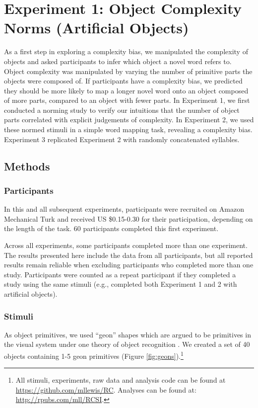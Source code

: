 \documentclass[man]{apa2}
\begin{document}
\section{Experiment 1: Object Complexity Norms (Artificial Objects)}

As a first step in exploring a complexity bias, we manipulated the complexity of objects and asked participants to infer which object a novel word refers to. Object complexity was manipulated by varying the number of primitive parts the objects were composed of. If participants have a complexity bias, we predicted they should be more likely to map a longer novel word onto an object composed of more parts, compared to an object with fewer parts. In Experiment 1, we first conducted a norming study to verify our intuitions that the number of object parts correlated with explicit judgements of complexity. In Experiment 2, we used these normed stimuli in a simple word mapping task, revealing a complexity bias. Experiment 3 replicated Experiment 2 with randomly concatenated syllables.


\subsection{Methods}

\subsubsection{Participants} In this and all subsequent experiments, participants were recruited on Amazon Mechanical Turk and received US \$0.15-0.30 for their participation, depending on the length of the task. 60 participants completed this first experiment.

Across all experiments, some participants completed more than one experiment. The results presented here include the data from all participants, but all reported results remain reliable when excluding participants who completed more than one study. Participants were counted as a repeat participant if they completed a study using the same stimuli (e.g., completed both Experiment 1 and 2 with artificial objects).

\subsubsection{Stimuli}
As object primitives, we used ``geon'' shapes which are argued to be primitives in the visual system under one theory of object recognition \cite{biederman1987}. We created a set of 40 objects containing 1-5 geon primitives (Figure \ref{fig:geons}).\footnote{All stimuli, experiments, raw data and analysis code can be found at \url{https://github.com/mllewis/RC}.
Analyses can be found at: \url{http://rpubs.com/mll/RCSI}.}
\end{document}
